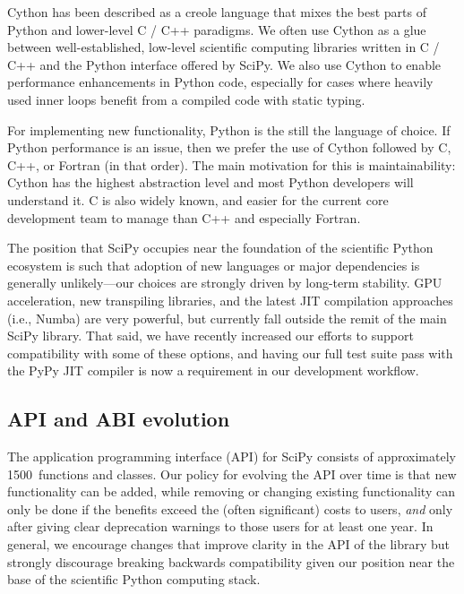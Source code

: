 \documentclass[fleqn,10pt]{wlscirep}
\begin{document}
Cython has been described as a creole language that mixes the best parts of Python and
lower-level C / C++ paradigms\cite{behnel2011cython}. We often use Cython
as a glue between well-established, low-level scientific computing libraries written
in C / C++ and the Python interface offered by SciPy. We also use Cython to enable performance
enhancements in Python code, especially for cases where heavily used inner
loops benefit from a compiled code with static typing.

For implementing new functionality, Python is the still the language of choice. If Python
performance is an issue, then we prefer the use of Cython followed by C, C++, or Fortran (in that
order). The main motivation for this is maintainability: Cython has the
highest abstraction level and most Python developers will understand it. C is
also widely known, and easier for the current core development team to manage
than C++ and especially Fortran.

The position that SciPy occupies near the
foundation of the scientific Python ecosystem is such that adoption of new
languages or major dependencies is generally unlikely---our choices are strongly
driven by long-term stability. GPU acceleration, new transpiling libraries, and
the latest JIT compilation approaches (i.e.,
Numba\cite{Lam:2015:NLP:2833157.2833162}) are very powerful, but currently fall
outside the remit of the main SciPy library. That said, we have recently
increased our efforts to support compatibility with some of these options, and
having our full test suite pass with the PyPy JIT
compiler\cite{Bolz:2009:TMP:1565824.1565827} is now a requirement in our
development workflow.

\subsection*{API and ABI evolution}

The application programming interface (API) for SciPy consists of approximately
\num{1500}~functions and classes.  Our policy for evolving the API over time is that
new functionality can be added, while removing or changing existing
functionality can only be done if the benefits exceed the (often
significant) costs to users, \textit{and} only after giving clear deprecation
warnings to those users for at least one year. In general, we encourage
changes that improve clarity in the API of the library but strongly discourage
breaking backwards compatibility given our position near the base of the
scientific Python computing stack.
\end{document}
